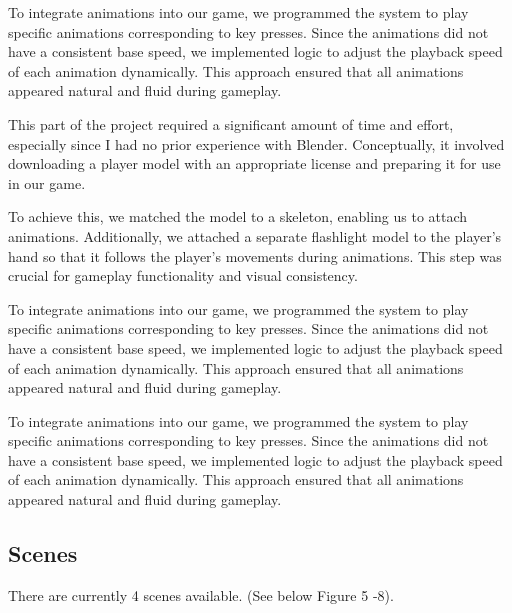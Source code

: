\documentclass[11pt]{article}
\begin{document}
\par To integrate animations into our game, we programmed the system to play specific animations corresponding to key presses. Since the animations did not have a consistent base speed, we implemented logic to adjust the playback speed of each animation dynamically. This approach ensured that all animations appeared natural and fluid during gameplay.


\par This part of the project required a significant amount of time and effort, especially since I had no prior experience with Blender. Conceptually, it involved downloading a player model with an appropriate license and preparing it for use in our game.

\par To achieve this, we matched the model to a skeleton, enabling us to attach animations. Additionally, we attached a separate flashlight model to the player’s hand so that it follows the player’s movements during animations. This step was crucial for gameplay functionality and visual consistency.

\par To integrate animations into our game, we programmed the system to play specific animations corresponding to key presses. Since the animations did not have a consistent base speed, we implemented logic to adjust the playback speed of each animation dynamically. This approach ensured that all animations appeared natural and fluid during gameplay.





\par To integrate animations into our game, we programmed the system to play specific animations corresponding to key presses. Since the animations did not have a consistent base speed, we implemented logic to adjust the playback speed of each animation dynamically. This approach ensured that all animations appeared natural and fluid during gameplay.





\subsection{Scenes}
\par There are currently 4 scenes available. (See below Figure 5 -8).
\end{document}
